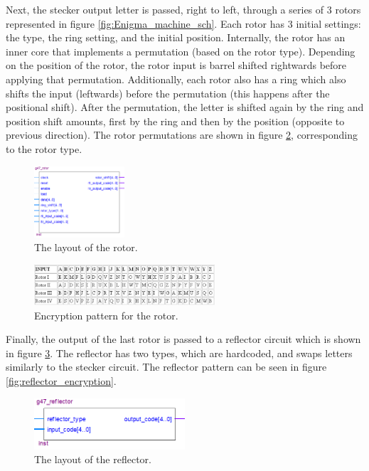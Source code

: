 \documentclass[10pt]{article}
\begin{document}
Next, the stecker output letter is passed, right to left, through a series of 3 rotors represented in figure \ref{fig:Enigma_machine_sch}. Each rotor has 3 initial settings: the type, the ring setting, and the initial position. Internally, the rotor has an inner core that implements a permutation (based on the rotor type). Depending on the position of the rotor, the rotor input is barrel shifted rightwards before applying that permutation. Additionally, each rotor also has a ring which also shifts the input (leftwards) before the permutation (this happens after the positional shift). After the permutation, the letter is shifted again by the ring and position shift amounts, first by the ring and then by the position (opposite to previous direction). The rotor permutations are shown in figure \ref{fig:rotor_encryption}, corresponding to the rotor type.
\begin{figure}[!htb]
    \centering
    \includegraphics[width=0.3\textwidth]{./rotor_layout.png}
    \caption{The layout of the rotor.}
    \label{fig:rotor_layout}
\end{figure}
\begin{figure}[!htb]
    \centering
    \includegraphics[width=0.6\textwidth]{./rotor_encryption.png}
    \caption{Encryption pattern for the rotor.}
    \label{fig:rotor_encryption}
\end{figure}
\newpage
Finally, the output of the last rotor is passed to a reflector circuit which is shown in figure \ref{fig:reflector_layout}. The reflector has two types, which are hardcoded, and swaps letters similarly to the stecker circuit. The reflector pattern can be seen in figure \ref{fig:reflector_encryption}.
\begin{figure}[!htb]
    \centering
    \includegraphics[width=0.5\textwidth]{./reflector_layout.png}
    \caption{The layout of the reflector.}
    \label{fig:reflector_layout}
\end{figure}
\end{document}
